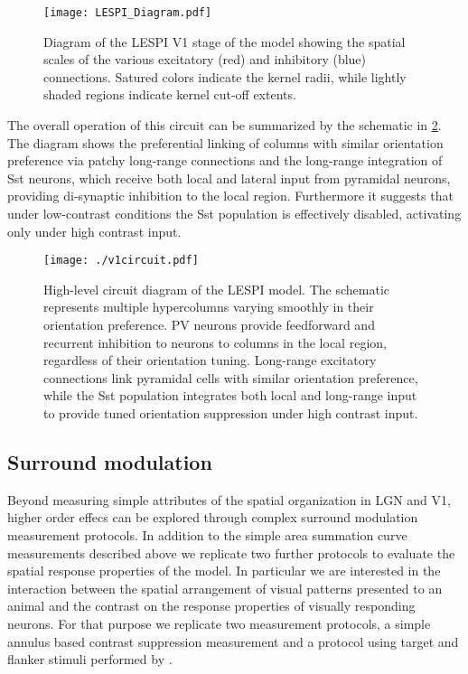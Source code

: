 \begin{figure}
	\centering
        \texttt{[image: LESPI\_Diagram.pdf]}
	\caption{Diagram of the LESPI V1 stage of the model showing the
          spatial scales of the various excitatory (red) and
          inhibitory (blue) connections. Satured colors indicate the
          kernel radii, while lightly shaded regions indicate kernel
          cut-off extents.}
	\label{LESPIDiagram}
\end{figure}

The overall operation of this circuit can be summarized by the
schematic in \ref{circuit_diagram}. The diagram shows the preferential
linking of columns with similar orientation preference via patchy
long-range connections and the long-range integration of Sst neurons,
which receive both local and lateral input from pyramidal neurons,
providing di-synaptic inhibition to the local region. Furthermore it
suggests that under low-contrast conditions the Sst population is
effectively disabled, activating only under high contrast input.

\begin{figure}
	\centering
	\texttt{[image: ./v1circuit.pdf]}
	\caption[High-level circuit diagram of the LESPI
      model.]{High-level circuit diagram of the LESPI model. The
      schematic represents multiple hypercolumns varying smoothly in
      their orientation preference. PV neurons provide feedforward and
      recurrent inhibition to neurons to columns in the local region,
      regardless of their orientation tuning. Long-range excitatory
      connections link pyramidal cells with similar orientation
      preference, while the Sst population integrates both local and
      long-range input to provide tuned orientation suppression under
      high contrast input.}
    \label{circuit_diagram}
\end{figure}

\subsection{Surround modulation}

Beyond measuring simple attributes of the spatial organization in LGN
and V1, higher order effecs can be explored through complex surround
modulation measurement protocols. In addition to the simple area
summation curve measurements described above we replicate two further
protocols to evaluate the spatial response properties of the model.
In particular we are interested in the interaction between the spatial
arrangement of visual patterns presented to an animal and the contrast
on the response properties of visually responding neurons. For that
purpose we replicate two measurement protocols, a simple annulus based
contrast suppression measurement \cite{Jones2002} and a protocol using
target and flanker stimuli performed by \cite{Kapadia1995}.

